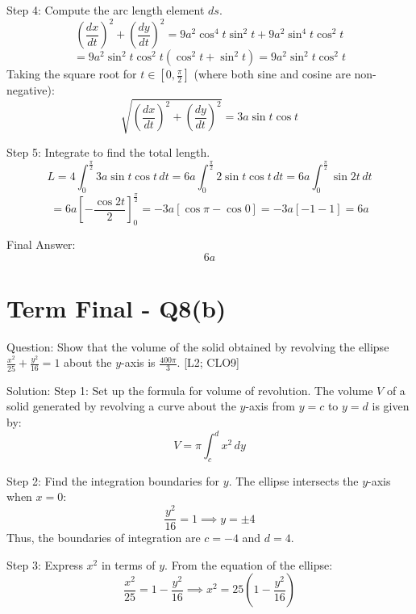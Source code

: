 \documentclass[11pt, a4paper]{article}
\begin{document}
Step 4: Compute the arc length element $ds$.
\[
\left(\frac{dx}{dt}\right)^2 + \left(\frac{dy}{dt}\right)^2 = 9a^2 \cos^4 t \sin^2 t + 9a^2 \sin^4 t \cos^2 t
\]
\[
= 9a^2 \sin^2 t \cos^2 t (\cos^2 t + \sin^2 t) = 9a^2 \sin^2 t \cos^2 t
\]
Taking the square root for $t \in [0, \frac{\pi}{2}]$ (where both sine and cosine are non-negative):
\[
\sqrt{\left(\frac{dx}{dt}\right)^2 + \left(\frac{dy}{dt}\right)^2} = 3a \sin t \cos t
\]

Step 5: Integrate to find the total length.
\[
L = 4 \int_{0}^{\frac{\pi}{2}} 3a \sin t \cos t \, dt = 6a \int_{0}^{\frac{\pi}{2}} 2\sin t \cos t \, dt = 6a \int_{0}^{\frac{\pi}{2}} \sin 2t \, dt
\]
\[
= 6a \left[ -\frac{\cos 2t}{2} \right]_{0}^{\frac{\pi}{2}} = -3a \left[ \cos \pi - \cos 0 \right] = -3a \left[ -1 - 1 \right] = 6a
\]

Final Answer:
\[
\boxed{6a}
\]





\section*{Term Final - Q8(b)}

Question:
Show that the volume of the solid obtained by revolving the ellipse $\frac{x^2}{25} + \frac{y^2}{16} = 1$ about the $y$-axis is $\frac{400\pi}{3}$. [L2; CLO9]

Solution:
Step 1: Set up the formula for volume of revolution.
The volume $V$ of a solid generated by revolving a curve about the $y$-axis from $y = c$ to $y = d$ is given by:
\[
V = \pi \int_{c}^{d} x^2 \, dy
\]

Step 2: Find the integration boundaries for $y$.
The ellipse intersects the $y$-axis when $x = 0$:
\[
\frac{y^2}{16} = 1 \implies y = \pm 4
\]
Thus, the boundaries of integration are $c = -4$ and $d = 4$.

Step 3: Express $x^2$ in terms of $y$.
From the equation of the ellipse:
\[
\frac{x^2}{25} = 1 - \frac{y^2}{16} \implies x^2 = 25 \left( 1 - \frac{y^2}{16} \right)
\]
\end{document}
